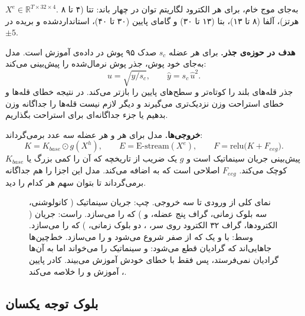 \textbf{} $X^{e}\in\mathbb{R}^{T\times32\times4}$. به‌جای موج خام، برای هر الکترود لگاریتم توان در چهار باند: تتا (۴ تا ۸ هرتز)، آلفا (۸ تا ۱۳)، بتا (۱۳ تا ۳۰) و گامای پایین (۳۰ تا ۴۰)، استانداردشده و بریده در $\pm5$.

\textbf{هدف در حوزه‌ی جذر.} برای هر عضله $s_c$ صدک ۹۵ پوش در داده‌ی آموزش است. مدل به‌جای خود پوش، جذر پوش نرمال‌شده را پیش‌بینی می‌کند:
\begin{equation}
u=\sqrt{y/s_c},\qquad \hat y=s_c\,\hat u^{2}.
\end{equation}
جذر قله‌های بلند را کوتاه‌تر و سطح‌های پایین را بازتر می‌کند. در نتیجه خطای قله‌ها و خطای استراحت وزن نزدیک‌تری می‌گیرند و دیگر لازم نیست قله‌ها را جداگانه وزن بدهیم یا جزء جداگانه‌ای برای استراحت بگذاریم.

\textbf{خروجی‌ها.} مدل برای هر  و هر عضله سه عدد برمی‌گرداند:
\begin{equation}
K=K_{base}\odot g(X^{h}),\qquad E=\mathrm{E\text{-}stream}(X^{e}),\qquad F=\mathrm{relu}\big(K+F_{eeg}\big).
\end{equation}
$K_{base}$ پیش‌بینی جریان سینماتیک است و $g$ یک ضریب از تاریخچه که آن را کمی بزرگ یا کوچک می‌کند. $F_{eeg}$ اصلاحی است که  به  اضافه می‌کند. مدل این اجزا را هم جداگانه برمی‌گرداند تا بتوان سهم هر کدام را دید.

\begin{figure}[p]
\centering

\caption{نمای کلی  از ورودی تا سه خروجی. چپ: جریان سینماتیک ( کانولوشنی، سه بلوک  زمانی، گراف پنج عضله،  و ) که  را می‌سازد. راست: جریان  ( الکترودها، گراف ۳۲ الکترود روی سر، ، دو بلوک  زمانی، ) که  را می‌سازد. وسط:  با  و یک  که از صفر شروع می‌شود و  را می‌سازد. خط‌چین‌ها جاهایی‌اند که گرادیان قطع می‌شود:   و  سینماتیک را می‌خواند اما به آن‌ها گرادیان نمی‌فرستد، پس  فقط با خطای خودش آموزش می‌بیند. کادر پایین ، آموزش و  را خلاصه می‌کند.}
\label{fig:v2-arch}
\end{figure}

\subsection{بلوک توجه یکسان}

